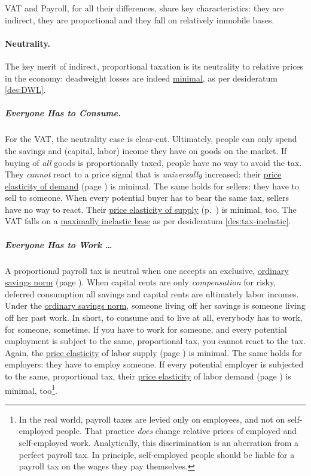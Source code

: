 VAT and Payroll, for all their differences, share key characteristics: they are indirect, they are proportional and they fall on relatively immobile bases.  %

\paragraph{Neutrality.} The key merit of indirect, proportional taxation is its neutrality to relative prices in the economy: deadweight losses are indeed \hyperref[des:DWL]{minimal}, as per desideratum \ref{des:DWL}.

\subparagraph{Everyone Has to Consume.} For the VAT, the neutrality case is clear-cut. Ultimately, people can only spend the savings and (capital, labor) income they have on goods on the market. If buying of \emph{all} goods is proportionally taxed, people have no way to avoid the tax. They \emph{cannot} react to a price signal that is \emph{universally} increased: their \hyperref[eq:PED]{price elasticity of demand} (page \pageref{eq:PED}) is minimal. The same holds for sellers: they have to sell to someone. When every potential buyer has to bear the same tax, sellers have no way to react. Their \hyperref[eq:PES]{price elasticity of supply} (p.~\pageref{eq:PES}) is minimal, too. The VAT falls on a \hyperref[des:tax-inelastic]{maximally inelastic base} as per desideratum \ref{des:tax-inelastic}.

\subparagraph{Everyone Has to Work \ldots} A proportional payroll tax is neutral when one accepts an exclusive, \hyperref[sec:OSN]{ordinary savings norm} (page \pageref{sec:OSN}). When capital rents are only \emph{compensation} for risky, deferred consumption all savings and capital rents are ultimately labor incomes. Under the \hyperref[sec:OSN]{ordinary savings norm}, someone living off her savings is someone living off her past work. In short, to consume and to live at all, everybody has to work, for someone, sometime. If you have to work for someone, and every potential employment is subject to the same, proportional tax, you cannot react to the tax. Again, the \hyperref[eq:PES]{price elasticity} of labor supply (page \pageref{eq:PES}) is minimal. The same holds for employers: they have to employ someone. If every potential employer is subjected to the same, proportional tax, their \hyperref[eq:PES]{price elasticity} of labor demand (page \pageref{eq:PES}) is minimal, too\footnote{In the real world, payroll taxes are levied only on employees, and not on self-employed people. That practice \emph{does} change relative prices of employed and self-employed work. Analytically, this discrimination is an aberration from a perfect payroll tax. In principle, self-employed people should be liable for a payroll tax on the wages they pay themselves.}.


